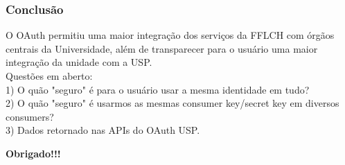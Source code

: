 \begin{frame}\frametitle{Conclusão}
O OAuth permitiu uma maior integração dos serviços da FFLCH com órgãos centrais da Universidade, 
além de transparecer para o usuário uma maior integração da unidade com a USP. 
\\
Questões em aberto:
\\1) O quão "seguro" é para o usuário usar a mesma identidade em tudo?
\\2) O quão "seguro" é usarmos as mesmas consumer key/secret key em diversos consumers?
\\3) Dados retornado nas APIs do OAuth USP.

\begin{center}
\textbf{Obrigado!!!}
\end{center}

\end{frame}
